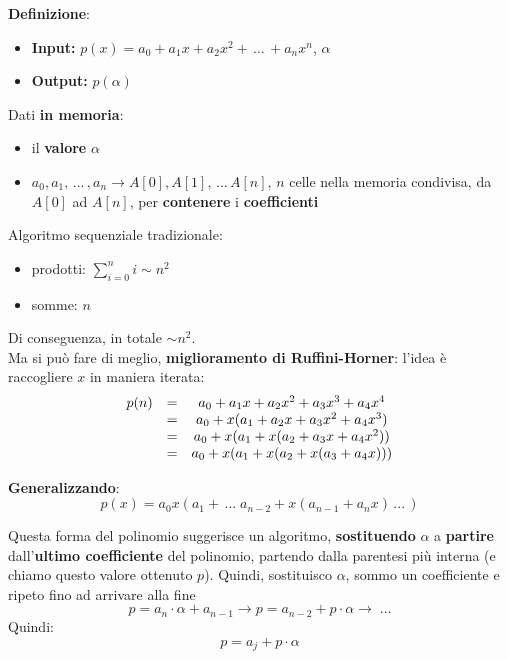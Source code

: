 \documentclass[11pt]{article}
\begin{document}
	\textbf{Definizione}:
	\begin{itemize}
		\item \textbf{Input:} $p(x) = a_0 + a_1 x + a_2 x^2 + \, ... \, + a_n x^n$, $\alpha$
		\item \textbf{Output:} $p(\alpha)$
	\end{itemize}
	
	Dati \textbf{in memoria}: 
	\begin{itemize}
		\item il \textbf{valore} $\alpha$
		\item $a_0, a_1, \, ... \, , a_n \rightarrow A[0], A[1], \, ... \, A[n]$, $n$ celle nella memoria condivisa, da $A[0]$ ad $A[n]$, per \textbf{contenere} i \textbf{coefficienti}
	\end{itemize}
	
	Algoritmo sequenziale tradizionale:
	\begin{itemize}
		\item prodotti: $\sum_{i=0}^n i \sim n^2$
		\item somme: $n$
	\end{itemize}
	Di conseguenza, in totale $\sim n^2$.\\
	
	Ma si può fare di meglio, \textbf{miglioramento di Ruffini-Horner}: l'idea è raccogliere $x$ in maniera iterata:
	$$ \begin{array}{c c c}
		p(n) & = & a_0 + a_1 x + a_2 x^2 + a_3 x^3 + a_4 x^4 \\
		& = & a_0 + x (a_1 + a_2 x + a_3 x^2 + a_4 x^3) \\ 
		& = & a_0 + x (a_1 + x (a_2 + a_3 x + a_4 x^2)) \\
		& = & a_0 + x (a_1 + x (a_2 + x (a_3 + a_4 x))) \\
	\end{array}$$
	
	\textbf{Generalizzando}:
	$$ p(x) = a_0 x(a_1 + \, ... \; a_{n-2} + x (a_{n-1} + a_n x) \, ... \,)$$
	
	Questa forma del polinomio suggerisce un algoritmo, \textbf{sostituendo} $\alpha$ a \textbf{partire} dall'\textbf{ultimo coefficiente} del polinomio, partendo dalla parentesi più interna (e chiamo questo valore ottenuto $p$). Quindi, sostituisco $\alpha$, sommo un coefficiente e ripeto fino ad arrivare alla fine
	$$ p = a_n \cdot \alpha + a_{n-1} \rightarrow p = a_{n-2} + p \cdot \alpha \rightarrow  \; ...$$
	Quindi: 
	$$ p = a_j + p \cdot \alpha $$
	
	\newpage
	
\end{document}

